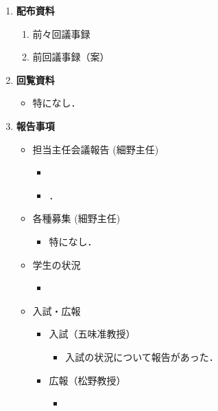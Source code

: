 \documentclass[10.5pt,a4paper]{jsarticle}
\begin{document}
\begin{enumerate}[label=\arabic*：, leftmargin=2zw, labelsep=1zw, itemsep=1\baselineskip]
    \item \textbf{配布資料}
        \begin{enumerate}[label=・\ 資料\arabic*：, leftmargin=6zw, nosep]
            \item 前々回議事録
            \item 前回議事録（案）
        \end{enumerate}

    \item \textbf{回覧資料}
        \begin{itemize}[label=・, leftmargin=1.5zw, nosep]
            \item 特になし．
        \end{itemize}
    
    
        \item \textbf{報告事項}
            
		\begin{itemize}[label=・, leftmargin=1.5zw, itemsep=1\baselineskip]%
		\item 担当主任会議報告 (細野主任)
		\begin{itemize}[label=-, leftmargin=2zw, nosep]
			\item 
			\item 
．
			
		\end{itemize}

		\item 各種募集 (細野主任)
		\begin{itemize}[label=-, leftmargin=2zw, nosep]
			\item 特になし．
		\end{itemize}

		\item 学生の状況
		\begin{itemize}[label=-, leftmargin=2zw, nosep]
			\item 
		\end{itemize}

		\item 入試・広報
		\begin{itemize}[label=-, leftmargin=2zw, nosep]
			\item 入試（五味准教授）
				\begin{itemize}
					\item 入試の状況について報告があった．
				\end{itemize}
			\item 広報（松野教授）
				\begin{itemize}
				\item 
			\end{itemize}
		\end{itemize}


\end{itemize}
\end{enumerate}
\end{document}
